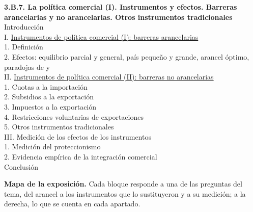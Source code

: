 \documentclass[11pt]{article}
\begin{document}
\begin{esquema}
\textbf{3.B.7. La política comercial (I). Instrumentos y efectos. Barreras arancelarias y no arancelarias. Otros instrumentos tradicionales}\\[2pt]
Introducción\\
I. \hyperref[sec:arancelarias]{Instrumentos de política comercial (I): barreras arancelarias}\\
\hspace*{1.5em}1. Definición\\
\hspace*{1.5em}2. Efectos: equilibrio parcial y general, país pequeño y grande, arancel óptimo, paradojas de  y \\
II. \hyperref[sec:no-arancelarias]{Instrumentos de política comercial (II): barreras no arancelarias}\\
\hspace*{1.5em}1. Cuotas a la importación\\
\hspace*{1.5em}2. Subsidios a la exportación\\
\hspace*{1.5em}3. Impuestos a la exportación\\
\hspace*{1.5em}4. Restricciones voluntarias de exportaciones\\
\hspace*{1.5em}5. Otros instrumentos tradicionales\\
III. Medición de los efectos de los instrumentos\\
\hspace*{1.5em}1. Medición del proteccionismo\\
\hspace*{1.5em}2. Evidencia empírica de la integración comercial\\
Conclusión
\end{esquema}

\begin{anotaciones}
\textbf{Mapa de la exposición.} Cada bloque responde a una de las preguntas del tema, del arancel a los instrumentos que lo sustituyeron y a su medición; a la derecha, lo que se cuenta en cada apartado.
\begin{infografiacaja}
\caption{Mapa del tema: la pregunta de cada bloque, sus apartados y el hilo que los une}\label{figu:mapa-tema}
\end{infografiacaja}
\end{anotaciones}
\end{document}
